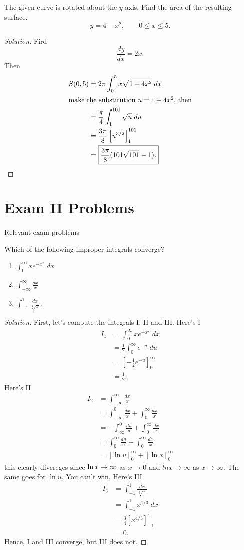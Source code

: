 \begin{problem}[WebAssign, HW 17, \# 8]
The given curve is rotated about the $y$-axis. Find the area of the
resulting surface.
\[
  y=4-x^2,\qquad 0\leq x\leq 5.
\]
\end{problem}
\begin{proof}[Solution]
Fird
\[
\frac{dy}{dx}=2x.
\]
Then
\begin{align*}
S(0,5)
&=2\pi\int_0^5 x\sqrt{1+4x^2}\;dx\\
\intertext{make the substitution $u=1+4x^2$, then}
&=\frac{\pi}{4}\int_1^{101}\sqrt{u}\;du\\
&=\frac{3\pi}{8}\left[u^{3/2}\right]_1^{101}\\
&=\boxed{\frac{3\pi}{8}(101\sqrt{101}-1).}
\end{align*}
\end{proof}
\chapter{Exam II Problems}
Relevant exam problems
\begin{problem}[Spring 2014, \# 8]
Which of the following improper integrals converge?
\begin{enumerate}[label=\MakeUppercase{\roman*}.]
\item $\displaystyle\int_0^\infty xe^{-x^2}\;dx$
\item $\displaystyle\int_{-\infty}^\infty\frac{dx}{x}$
\item $\displaystyle\int_{-1}^1\frac{dx}{\sqrt[3]{x}}$.
\end{enumerate}
\end{problem}
\begin{proof}[Solution]
First, let's compute the integrals I, II and III. Here's I
\begin{align*}
I_1&=\int_0^\infty xe^{-x^2}\;dx\\
   &=\frac{1}{2}\int_0^\infty e^{-u}\;du\\
   &=\left[-\frac{1}{2}e^{-u}\right]_0^\infty\\
   &=\frac{1}{2}.
\end{align*}
Here's II
\begin{align*}
I_2&=\int_{-\infty}^\infty\frac{dx}{x}\\
&=\int_{-\infty}^0\frac{dx}{x}+\int_0^\infty\frac{dx}{x}\\
&=-\int_\infty^0\frac{du}{u}+\int_0^\infty\frac{dx}{x}\\
&=\int_0^\infty\frac{du}{u}+\int_0^\infty\frac{dx}{x}\\
&=\left[\ln u\right]_0^\infty+\left[\ln x\right]_0^\infty
\end{align*}
this clearly divereges since $\ln x\to\-\infty$ as $x\to 0$ and $ln
x\to\infty$ as $x\to\infty$. The same goes for $\ln u$. You can't
win. Here's III
\begin{align*}
I_3&=\int_{-1}^1\frac{dx}{\sqrt[3]{x}}\\
   &=\int_{-1}^1x^{1/3}\;dx\\
   &=\frac{3}{4}\left[x^{4/3}\right]_{-1}^1\\
   &=0.
\end{align*}
Hence, I and III converge, but III does not.
\end{proof}

